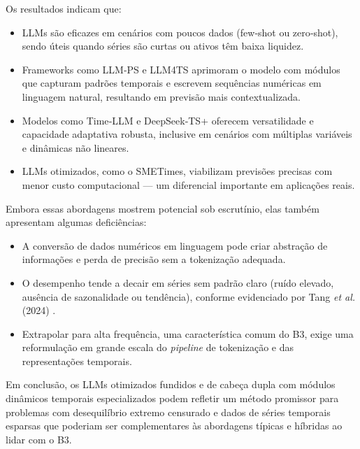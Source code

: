Os resultados indicam que:
\begin{itemize}
  \item LLMs são eficazes em cenários com poucos dados (few‑shot ou zero‑shot), sendo úteis quando séries são curtas ou ativos têm baixa liquidez.
  \item Frameworks como LLM‑PS e LLM4TS aprimoram o modelo com módulos que capturam padrões temporais e escrevem sequências numéricas em linguagem natural, resultando em previsão mais contextualizada.
  \item Modelos como Time‑LLM e DeepSeek‑TS+ oferecem versatilidade e capacidade adaptativa robusta, inclusive em cenários com múltiplas variáveis e dinâmicas não lineares.
  \item LLMs otimizados, como o SMETimes, viabilizam previsões precisas com menor custo computacional — um diferencial importante em aplicações reais.
\end{itemize}

Embora essas abordagens mostrem potencial sob escrutínio, elas também apresentam algumas deficiências:

\begin{itemize}
   \item A conversão de dados numéricos em linguagem pode criar abstração de informações e perda de precisão sem a tokenização adequada.
  \item O desempenho tende a decair em séries sem padrão claro (ruído elevado, ausência de sazonalidade ou tendência), conforme evidenciado por Tang \textit{et al.} (2024) \cite{tang2024llm_properties}.
  \item Extrapolar para alta frequência, uma característica comum do B3, exige uma reformulação em grande escala do \textit{pipeline} de tokenização e das representações temporais.
\end{itemize}

Em conclusão, os LLMs otimizados fundidos e de cabeça dupla com módulos dinâmicos temporais especializados podem refletir um método promissor para problemas com desequilíbrio extremo censurado e dados de séries temporais esparsas que poderiam ser complementares às abordagens típicas e híbridas ao lidar com o B3.



















